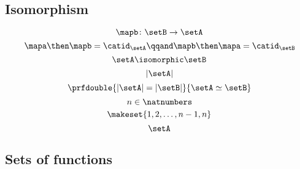 \begin{forslides}
    \subsection{Isomorphism}

    \begin{equation}\label{eq:slides_session2_148}
        \mapb \colon \setB \to \setA
    \end{equation}
    \begin{equation}\label{eq:slides_session2_149}
        \mapa \then \mapb = \catid_\setA
        \qqand
        \mapb \then \mapa = \catid_\setB
    \end{equation}
    \begin{equation}\label{eq:slides_session2_150}
        \setA \isomorphic \setB
    \end{equation}
    \begin{equation}\label{eq:slides_session2_151}
        \vert \setA \vert
    \end{equation}
    \begin{equation}\label{eq:slides_session2_152}
        \prfdouble{ \vert \setA \vert = \vert \setB \vert }{ \setA \simeq \setB }
    \end{equation}
    \begin{equation}\label{eq:slides_session2_153}
        n \in \natnumbers
    \end{equation}
    \begin{equation}\label{eq:slides_session2_154}
        \makeset{1,2, \dots, n-1, n}
    \end{equation}
    \begin{equation}\label{eq:slides_session2_155}
        \setA
    \end{equation}

    \subsection{Sets of functions}


\end{forslides}
